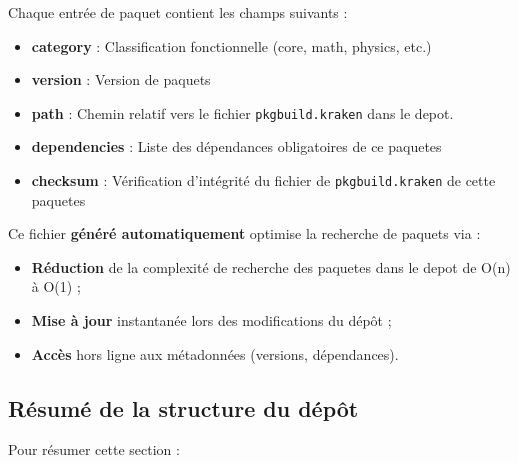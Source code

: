 Chaque entrée de paquet contient les champs suivants :
\begin{itemize}
    \item \textbf{category} : Classification fonctionnelle (core, math, physics, etc.)
    \item \textbf{version} : Version de paquets
    \item \textbf{path} : Chemin relatif vers le fichier \texttt{pkgbuild.kraken} dans le depot.
    \item \textbf{dependencies} : Liste des dépendances obligatoires de ce paquetes
    \item \textbf{checksum} : Vérification d'intégrité  du fichier de \texttt{pkgbuild.kraken} de cette paquetes
\end{itemize}
Ce fichier \textbf{généré automatiquement} optimise la recherche de paquets via :
\begin{itemize}
\item \textbf{Réduction} de la complexité de recherche des paquetes dans le depot  de O(n) à O(1) ;
\item \textbf{Mise à jour} instantanée lors des modifications du dépôt ;
\item \textbf{Accès} hors ligne aux métadonnées (versions, dépendances).
\end{itemize}





\clearpage
\subsection{Résumé de la structure du dépôt}
\label{subsec:resume-depot}

Pour résumer cette section :

